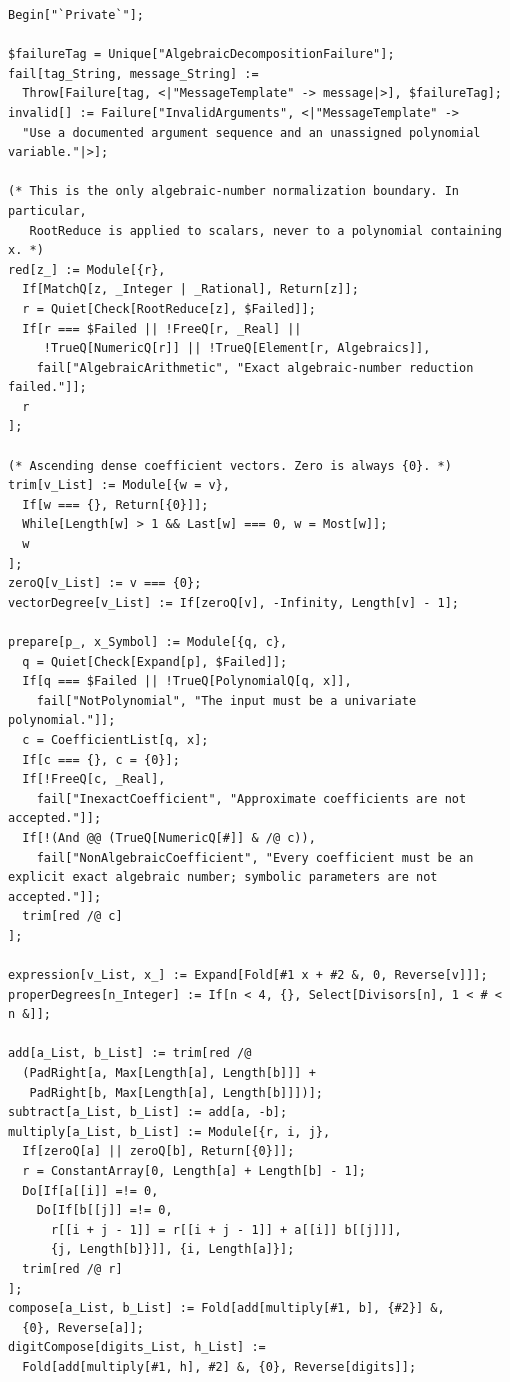 \documentclass[11pt,a4paper]{article}
\numberwithin{equation}{section}
\theoremstyle{definition}
\theoremstyle{remark}
\begin{document}
\begin{lstlisting}
Begin["`Private`"];

$failureTag = Unique["AlgebraicDecompositionFailure"];
fail[tag_String, message_String] :=
  Throw[Failure[tag, <|"MessageTemplate" -> message|>], $failureTag];
invalid[] := Failure["InvalidArguments", <|"MessageTemplate" ->
  "Use a documented argument sequence and an unassigned polynomial variable."|>];

(* This is the only algebraic-number normalization boundary. In particular,
   RootReduce is applied to scalars, never to a polynomial containing x. *)
red[z_] := Module[{r},
  If[MatchQ[z, _Integer | _Rational], Return[z]];
  r = Quiet[Check[RootReduce[z], $Failed]];
  If[r === $Failed || !FreeQ[r, _Real] ||
     !TrueQ[NumericQ[r]] || !TrueQ[Element[r, Algebraics]],
    fail["AlgebraicArithmetic", "Exact algebraic-number reduction failed."]];
  r
];

(* Ascending dense coefficient vectors. Zero is always {0}. *)
trim[v_List] := Module[{w = v},
  If[w === {}, Return[{0}]];
  While[Length[w] > 1 && Last[w] === 0, w = Most[w]];
  w
];
zeroQ[v_List] := v === {0};
vectorDegree[v_List] := If[zeroQ[v], -Infinity, Length[v] - 1];

prepare[p_, x_Symbol] := Module[{q, c},
  q = Quiet[Check[Expand[p], $Failed]];
  If[q === $Failed || !TrueQ[PolynomialQ[q, x]],
    fail["NotPolynomial", "The input must be a univariate polynomial."]];
  c = CoefficientList[q, x];
  If[c === {}, c = {0}];
  If[!FreeQ[c, _Real],
    fail["InexactCoefficient", "Approximate coefficients are not accepted."]];
  If[!(And @@ (TrueQ[NumericQ[#]] & /@ c)),
    fail["NonAlgebraicCoefficient", "Every coefficient must be an explicit exact algebraic number; symbolic parameters are not accepted."]];
  trim[red /@ c]
];

expression[v_List, x_] := Expand[Fold[#1 x + #2 &, 0, Reverse[v]]];
properDegrees[n_Integer] := If[n < 4, {}, Select[Divisors[n], 1 < # < n &]];

add[a_List, b_List] := trim[red /@
  (PadRight[a, Max[Length[a], Length[b]]] +
   PadRight[b, Max[Length[a], Length[b]]])];
subtract[a_List, b_List] := add[a, -b];
multiply[a_List, b_List] := Module[{r, i, j},
  If[zeroQ[a] || zeroQ[b], Return[{0}]];
  r = ConstantArray[0, Length[a] + Length[b] - 1];
  Do[If[a[[i]] =!= 0,
    Do[If[b[[j]] =!= 0,
      r[[i + j - 1]] = r[[i + j - 1]] + a[[i]] b[[j]]],
      {j, Length[b]}]], {i, Length[a]}];
  trim[red /@ r]
];
compose[a_List, b_List] := Fold[add[multiply[#1, b], {#2}] &,
  {0}, Reverse[a]];
digitCompose[digits_List, h_List] :=
  Fold[add[multiply[#1, h], #2] &, {0}, Reverse[digits]];


\end{lstlisting}
\end{document}
